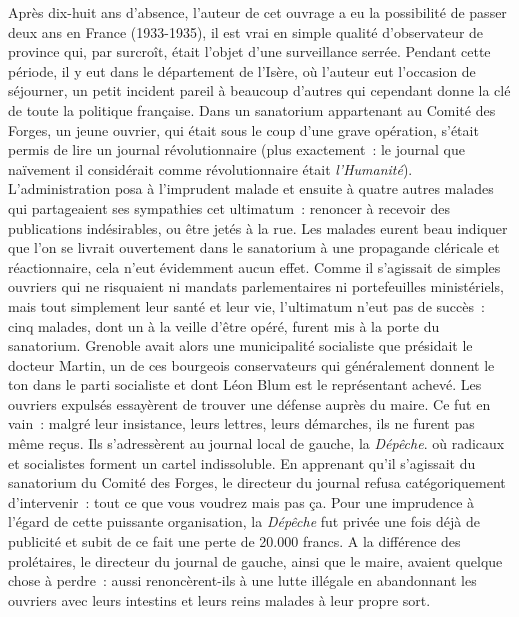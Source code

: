 \documentclass[french,twoside]{book} %
\begin{document}
Après dix-huit ans d’absence, l’auteur de cet ouvrage a eu la possibilité de passer deux ans en France (1933-1935), il est vrai en simple qualité d’observateur de province qui, par surcroît, était l’objet d’une surveillance serrée. Pendant cette période, il y eut dans le département de l’Isère, où l’auteur eut l’occasion de séjourner, un petit incident pareil à beaucoup d’autres qui cependant donne la clé de toute la politique française. Dans un sanatorium appartenant au Comité des Forges, un jeune  ouvrier, qui était sous le coup d’une grave opération, s’était permis de lire un journal révolutionnaire (plus exactement : le journal que naïvement il considérait comme révolutionnaire était \emph{l’Humanité}). L’administration posa à l’imprudent malade et ensuite à quatre autres malades qui partageaient ses sympathies cet ultimatum : renoncer à recevoir des publications indésirables, ou être jetés à la rue. Les malades eurent beau indiquer que l’on se livrait ouvertement dans le sanatorium à une propagande cléricale et réactionnaire, cela n’eut évidemment aucun effet. Comme il s’agissait de simples ouvriers qui ne risquaient ni mandats parlementaires ni portefeuilles ministériels, mais tout simplement leur santé et leur vie, l’ultimatum n’eut pas de succès : cinq malades, dont un à la veille d’être opéré, furent mis à la porte du sanatorium. Grenoble avait alors une municipalité socialiste que présidait le docteur Martin, un de ces bourgeois conservateurs qui généralement donnent le ton dans le parti socialiste et dont Léon Blum est le représentant achevé. Les ouvriers expulsés essayèrent de trouver une défense auprès du maire. Ce fut en vain : malgré leur insistance, leurs lettres, leurs démarches, ils ne furent pas même reçus. Ils s’adressèrent au journal local de gauche, la \emph{Dépêche}. où radicaux et socialistes forment un cartel indissoluble. En apprenant qu’il s’agissait du sanatorium du Comité des Forges, le directeur du journal refusa catégoriquement d’intervenir : tout ce que vous voudrez mais pas ça. Pour une imprudence à l’égard de cette puissante organisation, la \emph{Dépêche} fut privée une fois déjà de publicité et subit de ce fait une perte de 20.000 francs. A la différence des prolétaires, le directeur du journal de gauche, ainsi que le maire, avaient quelque chose à perdre : aussi renoncèrent-ils à une lutte illégale en abandonnant les ouvriers avec leurs intestins et leurs reins malades à leur propre sort.\par
\end{document}
